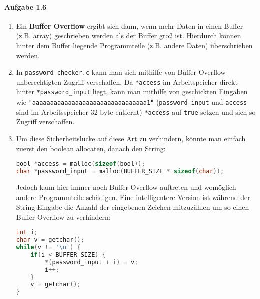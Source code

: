 \documentclass[11pt]{article}
\begin{document}
\paragraph{Aufgabe 1.6}
\begin{enumerate}[label=\alph*)]
\item Ein \textbf{Buffer Overflow} ergibt sich dann, wenn mehr Daten in einen Buffer (z.B. array) geschrieben werden als der Buffer groß ist. Hierdurch können hinter dem Buffer liegende Programmteile (z.B. andere Daten) überschrieben werden.

\item In \verb|password_checker.c| kann man sich mithilfe von Buffer Overflow unberechtigten Zugriff verschaffen. Da \verb|*access| im Arbeitspeicher direkt hinter \verb|*password_input| liegt, kann man mithilfe von geschickten Eingaben wie \verb|"aaaaaaaaaaaaaaaaaaaaaaaaaaaaaaaa1"| (\verb|password_input| und \verb|access| sind im Arbeitsspeicher 32 byte entfernt) \verb|*access| auf \verb|true| setzen und sich so Zugriff verschaffen.

\item Um diese Sicherheitslücke auf diese Art zu verhindern, könnte man einfach zuerst den boolean allocaten, danach den String:
\begin{lstlisting}[language=C]
bool *access = malloc(sizeof(bool));
char *password_input = malloc(BUFFER_SIZE * sizeof(char));
\end{lstlisting}
Jedoch kann hier immer noch Buffer Overflow auftreten und womöglich andere Programmteile schädigen. Eine intelligentere Version ist während der String-Eingabe die Anzahl der eingebenen Zeichen mitzuzählen um so einen Buffer Overflow zu verhindern:
\begin{lstlisting}[language=C]
int i;
char v = getchar();
while(v != '\n') {
	if(i < BUFFER_SIZE) {
		*(password_input + i) = v;
		i++;
	}
	v = getchar();
}
\end{lstlisting}
\end{enumerate}
\end{document}
